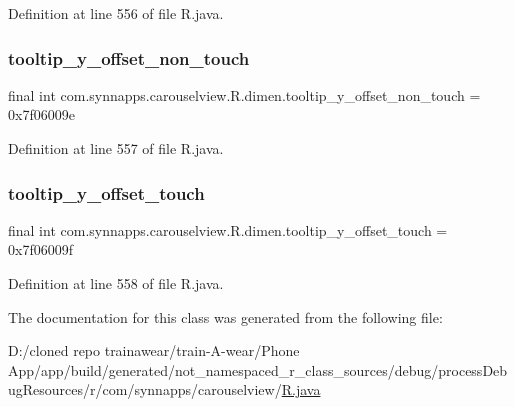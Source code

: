 Definition at line 556 of file R.\+java.

\mbox{\label{classcom_1_1synnapps_1_1carouselview_1_1_r_1_1dimen_a58ff33fa5fc7a378ea08587f7ddc8915}} 
\subsubsection{\texorpdfstring{tooltip\_y\_offset\_non\_touch}{tooltip\_y\_offset\_non\_touch}}
{\footnotesize\ttfamily final int com.\+synnapps.\+carouselview.\+R.\+dimen.\+tooltip\+\_\+y\+\_\+offset\+\_\+non\+\_\+touch = 0x7f06009e\hspace{0.3cm}{\ttfamily [static]}}



Definition at line 557 of file R.\+java.

\mbox{\label{classcom_1_1synnapps_1_1carouselview_1_1_r_1_1dimen_a306c12dc324e70dad041a6355795fa4d}} 
\subsubsection{\texorpdfstring{tooltip\_y\_offset\_touch}{tooltip\_y\_offset\_touch}}
{\footnotesize\ttfamily final int com.\+synnapps.\+carouselview.\+R.\+dimen.\+tooltip\+\_\+y\+\_\+offset\+\_\+touch = 0x7f06009f\hspace{0.3cm}{\ttfamily [static]}}



Definition at line 558 of file R.\+java.



The documentation for this class was generated from the following file\+:\begin{DoxyCompactItemize}
\item 
D\+:/cloned repo trainawear/train-\/\+A-\/wear/\+Phone App/app/build/generated/not\+\_\+namespaced\+\_\+r\+\_\+class\+\_\+sources/debug/process\+Debug\+Resources/r/com/synnapps/carouselview/\mbox{\hyperlink{process_debug_resources_2r_2com_2synnapps_2carouselview_2_r_8java}{R.\+java}}\end{DoxyCompactItemize}
